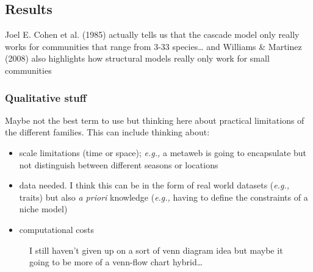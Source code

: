 \documentclass[
]{agujournal2019}
\providecommand{\tightlist}{%
  \setlength{\itemsep}{0pt}\setlength{\parskip}{0pt}}\usepackage{longtable,booktabs,array}
\begin{document}
\subsection{Results}\label{results}

Joel E. Cohen et al. (1985) actually tells us that the cascade model
only really works for communities that range from 3-33 species\ldots{}
and Williams \& Martinez (2008) also highlights how structural models
really only work for small communities

\subsubsection{Qualitative stuff}\label{qualitative-stuff}

Maybe not the best term to use but thinking here about practical
limitations of the different families. This can include thinking about:

\begin{itemize}
\tightlist
\item
  scale limitations (time or space); \emph{e.g.,} a metaweb is going to
  encapsulate but not distinguish between different seasons or locations
\item
  data needed. I think this can be in the form of real world datasets
  (\emph{e.g.,} traits) but also \emph{a priori} knowledge (\emph{e.g.,}
  having to define the constraints of a niche model)
\item
  computational costs
\end{itemize}

\begin{figure}


\caption{\label{fig-venn}I still haven't given up on a sort of venn
diagram idea but maybe it going to be more of a venn-flow chart
hybrid\ldots{}}

\end{figure}%
\end{document}
